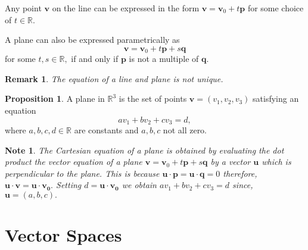 \documentclass[12pt, a4paper]{article}
\newtheorem*{remark}{Remark}
\newtheorem*{note}{Note}
\theoremstyle{definition}
\newtheorem{proposition}{Proposition}
\theoremstyle{plain}
\newcommand{\bb}[1]{\mathbb{#1}}
\newcommand{\vect}[1]{\mathbf{#1}}
\begin{document}
Any point $\vect{v}$ on the line can be expressed in the form $\vect{v}=\vect{v}_0+t\vect{p}$ for some choice of $t \in \bb{R}.$

A plane can also be expressed parametrically as $$\vect{v}=\vect{v}_0+t\vect{p}+s\vect{q}$$ for some $t,s \in \bb{R},$ if and only if $\vect{p}$ is not a multiple of $\vect{q}.$

\begin{remark}
The equation of a line and plane is not unique.
\end{remark}

\begin{proposition} A plane in $\bb{R}^3$ is the set of points $\vect{v}=(v_1,v_2,v_3)$ satisfying an equation $$av_1+bv_2+cv_3=d,$$ where $a,b,c,d \in \bb{R}$ are constants and $a,b,c$ not all zero.\end{proposition}

\begin{note}
The Cartesian equation of a plane is obtained by evaluating the dot product the vector equation of a plane $\vect{v}=\vect{v}_0+t\vect{p}+s\vect{q}$ by a vector $\vect{u}$ which is perpendicular to the plane. This is because $\vect{u \cdot p}=\vect{u \cdot q} = 0$ therefore, $\vect{u \cdot v}= \vect{u \cdot v_0}.$ Setting $d=\vect{u \cdot v_0}$ we obtain $av_1+bv_2+cv_3=d$ since, $\vect{u}=(a,b,c).$
\end{note}

\section{Vector Spaces}
\end{document}
